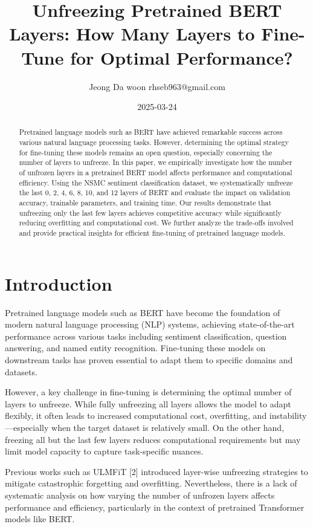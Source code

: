 \documentclass{article}
\title{\textbf{\LARGE Unfreezing Pretrained BERT Layers: How Many Layers to Fine-Tune for Optimal Performance?}}
\author{Jeong Da woon rhseb963@gmail.com}
\date{2025-03-24}
\begin{document}
\maketitle

\begin{abstract}
Pretrained language models such as BERT have achieved remarkable success across various natural language processing tasks. However, determining the optimal strategy for fine-tuning these models remains an open question, especially concerning the number of layers to unfreeze. In this paper, we empirically investigate how the number of unfrozen layers in a pretrained BERT model affects performance and computational efficiency. Using the NSMC sentiment classification dataset, we systematically unfreeze the last 0, 2, 4, 6, 8, 10, and 12 layers of BERT and evaluate the impact on validation accuracy, trainable parameters, and training time. Our results demonstrate that unfreezing only the last few layers achieves competitive accuracy while significantly reducing overfitting and computational cost. We further analyze the trade-offs involved and provide practical insights for efficient fine-tuning of pretrained language models.
\end{abstract}


\section{Introduction}

Pretrained language models such as BERT have become the foundation of modern natural language processing (NLP) systems, achieving state-of-the-art performance across various tasks including sentiment classification, question answering, and named entity recognition. Fine-tuning these models on downstream tasks has proven essential to adapt them to specific domains and datasets.

However, a key challenge in fine-tuning is determining the optimal number of layers to unfreeze. While fully unfreezing all layers allows the model to adapt flexibly, it often leads to increased computational cost, overfitting, and instability—especially when the target dataset is relatively small. On the other hand, freezing all but the last few layers reduces computational requirements but may limit model capacity to capture task-specific nuances.

Previous works such as ULMFiT [2] introduced layer-wise unfreezing strategies to mitigate catastrophic forgetting and overfitting. Nevertheless, there is a lack of systematic analysis on how varying the number of unfrozen layers affects performance and efficiency, particularly in the context of pretrained Transformer models like BERT.
\end{document}
